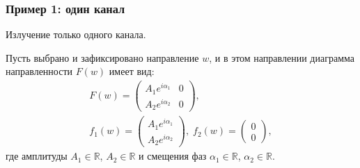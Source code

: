 \subsubsection{Пример 1: один канал}

Излучение только одного канала.

Пусть выбрано и зафиксировано направление $w$, и в этом направлении диаграмма направленности $F(w)$ имеет вид:
\begin{gather*}
    F(w)
    = \begin{pmatrix}
          A_1 e^{i \alpha_1} & 0 \\
          A_2 e^{i \alpha_2} & 0
    \end{pmatrix} , \\
%
    f_1(w) = \begin{pmatrix}
                 A_1 e^{i \alpha_1} \\
                 A_2 e^{i \alpha_2}
    \end{pmatrix}
    , \;
    f_2(w) = \begin{pmatrix}
                 0 \\
                 0
    \end{pmatrix} ,
\end{gather*}
где амплитуды $A_1 \in \mathbb{R}$, $A_2 \in \mathbb{R}$ и смещения фаз $\alpha_1 \in \mathbb{R}$, $\alpha_2 \in \mathbb{R}$.

